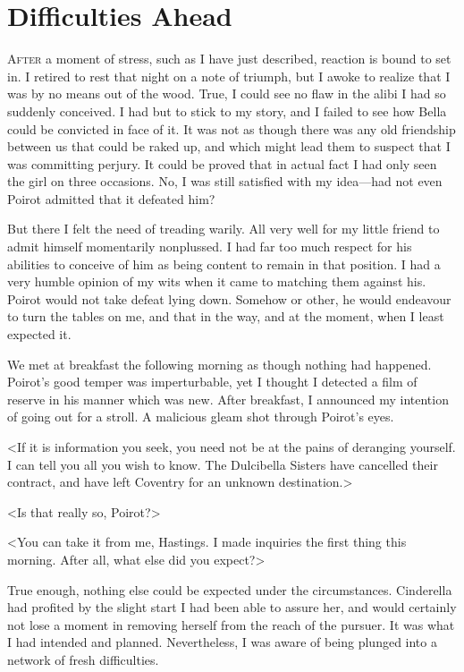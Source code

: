 \chapter{Difficulties Ahead}

\lettrine{A}{fter} a moment of stress, such as I have just described, reaction is bound to set in. I retired to rest that night on a note of triumph, but I awoke to realize that I was by no means out of the wood. True, I could see no flaw in the alibi I had so suddenly conceived. I had but to stick to my story, and I failed to see how Bella could be convicted in face of it. It was not as though there was any old friendship between us that could be raked up, and which might lead them to suspect that I was committing perjury. It could be proved that in actual fact I had only seen the girl on three occasions. No, I was still satisfied with my idea—had not even Poirot admitted that it defeated him? 

 But there I felt the need of treading warily. All very well for my little friend to admit himself momentarily nonplussed. I had far too much respect for his abilities to conceive of him as being content to remain in that position. I had a very humble opinion of my wits when it came to matching them against his. Poirot would not take defeat lying down. Somehow or other, he would endeavour to turn the tables on me, and that in the way, and at the moment, when I least expected it. 

 We met at breakfast the following morning as though nothing had happened. Poirot's good temper was imperturbable, yet I thought I detected a film of reserve in his manner which was new. After breakfast, I announced my intention of going out for a stroll. A malicious gleam shot through Poirot's eyes. 

 <If it is information you seek, you need not be at the pains of deranging yourself. I can tell you all you wish to know. The Dulcibella Sisters have cancelled their contract, and have left Coventry for an unknown destination.> 

 <Is that really so, Poirot?> 

 <You can take it from me, Hastings. I made inquiries the first thing this morning. After all, what else did you expect?> 

 True enough, nothing else could be expected under the circumstances. Cinderella had profited by the slight start I had been able to assure her, and would certainly not lose a moment in removing herself from the reach of the pursuer. It was what I had intended and planned. Nevertheless, I was aware of being plunged into a network of fresh difficulties. 

